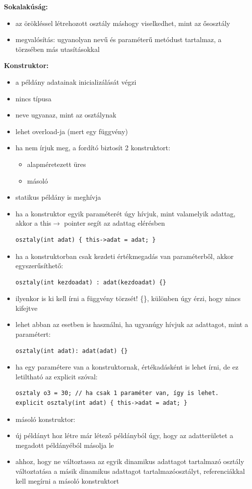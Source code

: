 \noindent \textbf{Sokalakúság:}
\begin{itemize}
    \item az örökléssel létrehozott osztály máshogy viselkedhet, mint az ősosztály
    \item megvalósítás: ugyanolyan nevű és paraméterű metódust tartalmaz, a törzsében más utasításokkal
\end{itemize}

\noindent \textbf{Konstruktor:}
\begin{itemize}
    \item a példány adatainak inicializálását végzi
    \item nincs típusa
    \item neve ugyanaz, mint az osztálynak
    \item lehet overload-ja (mert egy függvény)
    \item ha nem írjuk meg, a fordító biztosít 2 konstruktort:
    \begin{itemize}
        \item alapméretezett üres
        \item másoló
    \end{itemize}
    \item statikus példány is meghívja
    \item ha a konstruktor egyik paraméterét úgy hívjuk, mint valamelyik adattag, akkor a this$\rightarrow$ pointer segít az adattag elérésben
\begin{verbatim}
osztaly(int adat) { this->adat = adat; }
\end{verbatim}
    \item ha a konstruktorban csak kezdeti értékmegadás van paraméterből, akkor egyszerűsíthető:
\begin{verbatim}
osztaly(int kezdoadat) : adat(kezdoadat) {}
\end{verbatim}
    \item ilyenkor is ki kell írni a függvény törzsét! \{\}, különben úgy érzi, hogy nincs kifejtve
    \item lehet abban az esetben is használni, ha ugyanúgy hívjuk az adattagot, mint a paramétert:
\begin{verbatim}
osztaly(int adat): adat(adat) {}
\end{verbatim}
    \item ha egy paramétere van a konstruktornak, értékadásként is lehet írni, de ez letiltható az explicit szóval:
\begin{verbatim}
osztaly o3 = 30; // ha csak 1 paraméter van, így is lehet.
explicit osztaly(int adat) { this->adat = adat; }
\end{verbatim}
    \item másoló konstruktor:
    \item új példányt hoz létre már létező példányból úgy, hogy az adatterületet a megadott példányéból másolja le
    \item ahhoz, hogy ne változtassa az egyik dinamikus adattagot tartalmazó osztály változtatása a másik dinamikus adattagot tartalmazóosztályt, referenciákkal kell megírni a másoló konstruktort
\end{itemize}


